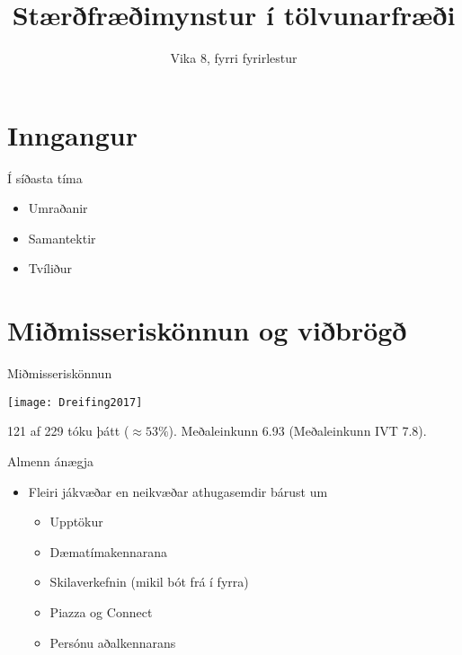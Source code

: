 \documentclass[handout]{beamer}
\title{Stærðfræðimynstur í tölvunarfræði}
\subtitle{Vika 8, fyrri fyrirlestur}
\begin{document}
\begin{frame}
\titlepage
\end{frame}


\section{Inngangur}

\begin{frame}{Í síðasta tíma}
    \begin{itemize}
        \item Umraðanir
        \item Samantektir
        \item Tvíliður
    \end{itemize}
\end{frame}

\section{Miðmisseriskönnun og viðbrögð}

\begin{frame}{Miðmisseriskönnun}
    \begin{center}
        \texttt{[image: Dreifing2017]}
    \end{center}
    121 af 229 tóku þátt ($\approx 53\%$). Meðaleinkunn 6.93 (Meðaleinkunn IVT 7.8).
\end{frame}

\begin{frame}{Almenn ánægja}
    \begin{itemize}
        \item Fleiri jákvæðar en neikvæðar athugasemdir bárust um
        \begin{itemize}[<+->]
            \item Upptökur
            \item Dæmatímakennarana
            \item Skilaverkefnin (mikil bót frá í fyrra)
            \item Piazza og Connect
            \item Persónu aðalkennarans
        \end{itemize}
    \end{itemize}
\end{frame}
\end{document}

